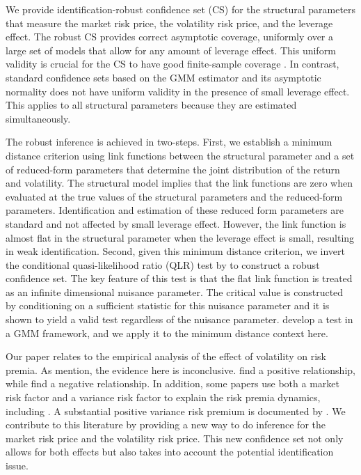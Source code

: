 \documentclass[11pt, letterpaper, twoside]{article}
\begin{document}
We provide identification-robust confidence set (CS) for the structural parameters that measure the market risk price, the volatility risk price, and the leverage effect. 
The robust CS provides correct asymptotic coverage, uniformly over a large set of models that allow for any amount of leverage effect. This uniform validity is crucial for the CS to have good finite-sample coverage \parencites{mikusheva2007uniform, andrews2010applications}. In contrast, standard confidence sets based on the GMM estimator and its asymptotic normality does not have uniform validity in the presence of small leverage effect. This applies to all structural parameters because they are estimated simultaneously.


The robust inference is achieved in two-steps. First, we establish a minimum distance criterion using link functions between the structural parameter and a set of reduced-form parameters that determine the joint distribution of the return and volatility. The structural model implies that the link functions are zero when evaluated at the true values of the structural parameters and the reduced-form parameters. Identification and estimation of these reduced form parameters are standard and not affected by small leverage effect. However, the link function is almost flat in the structural parameter when the leverage effect is small, resulting in weak identification. Second, given this minimum distance criterion, we invert the conditional quasi-likelihood ratio (QLR) test by \textcite{andrews2016conditional} to construct a robust confidence set. The key feature of this test is that the flat link function is treated as an infinite dimensional nuisance parameter. The critical value is constructed by conditioning on a sufficient statistic for this nuisance parameter and it is shown to yield a valid test regardless of the nuisance parameter. \Textcite{andrews2016conditional} develop a test in a GMM framework, and we apply it to the minimum distance context here.


Our paper relates to the empirical analysis of the effect of volatility on risk premia. As \textcite{lettau2010measuring} mention,  the evidence here is inconclusive. \textcites{bollerslev1988capital, harvey1989timevarying, ghysels2005there, bali2006there, ludvigson2007empirical} find a positive relationship, while \textcites{campbell1987stock, breen1989economic, pagan1991nonparametric, whitelaw1994time, brandt2004relationship} find a negative relationship. In addition, some papers use both a market risk factor and a variance risk factor to explain the risk premia dynamics, including \textcites{christoffersen2013capturing, feunou2014risk, dewbecker2017price}. A substantial positive variance risk premium is documented by \textcites{bollerslev2008risk, drechsler2011whats}. We contribute to this literature by providing a new way to do inference for the market risk price and the volatility risk price. This new confidence set not only allows for both effects but also takes into account the potential identification issue.
\end{document}
